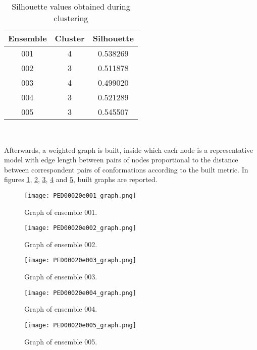 \begin{table}[H]
\begin{center}
\begin{tabular}{ccc}
\textbf{Ensemble} & \textbf{Cluster} & \textbf{Silhouette}\\
\hline
001 & 4 & 0.538269\\
\hline
002 & 3 & 0.511878\\
\hline
003 & 4 & 0.499020\\
\hline
004 & 3 & 0.521289\\
\hline
005 & 3 & 0.545507\\
\end{tabular}
\end{center}
\caption{Silhouette values obtained during clustering}~\label{tab:silhouette}
\end{table}

Afterwards, a weighted graph is built, inside which each node is a representative model with edge length between pairs of nodes proportional to the distance between correspondent pairs of conformations according to the built metric. In figures \ref{model001}, \ref{model002}, \ref{model003}, \ref{model004} and \ref{model005}, built graphs are reported.

\begin{figure}[H]
    \centering
	\texttt{[image: PED00020e001\_graph.png]}
	\caption{Graph of ensemble 001.}
	\label{model001}
\end{figure}

\begin{figure}[H]
    \centering
		\texttt{[image: PED00020e002\_graph.png]}
		\caption{Graph of ensemble 002.}
		\label{model002}
\end{figure}

\begin{figure}[H]
    \centering
		\texttt{[image: PED00020e003\_graph.png]}
		\caption{Graph of ensemble 003.}
		\label{model003}
\end{figure}

\begin{figure}[H]
    \centering
		\texttt{[image: PED00020e004\_graph.png]}
		\caption{Graph of ensemble 004.}
		\label{model004}
\end{figure}

\begin{figure}[H]
    \centering
		\texttt{[image: PED00020e005\_graph.png]}
		\caption{Graph of ensemble 005.}
		\label{model005}
\end{figure}

